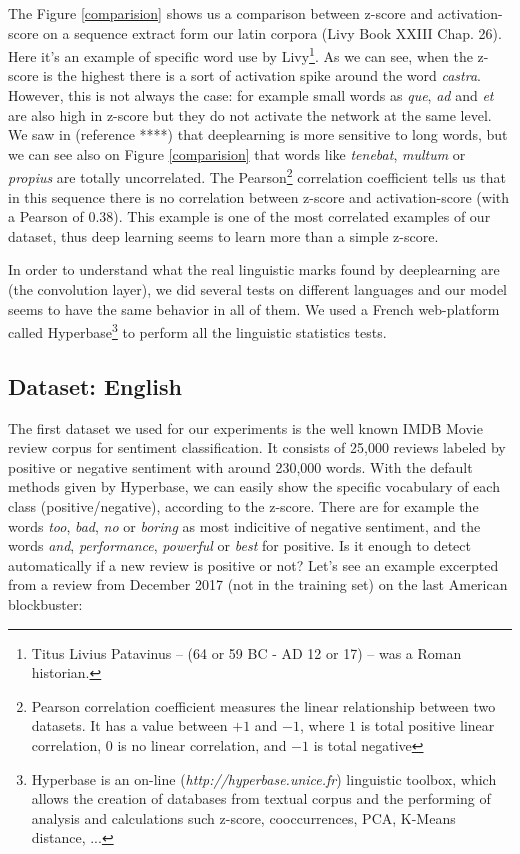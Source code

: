 The Figure \ref{comparision} shows us a comparison between z-score and activation-score on a sequence extract form our latin corpora (Livy Book XXIII Chap. 26). Here it's an example of specific word use by Livy\footnote{Titus Livius Patavinus -- (64 or 59 BC - AD 12 or 17) -- was a Roman historian.}. As we can see, when the z-score is the highest there is a sort of activation spike around the word \textit{castra}. However, this is not always the case: for example small words as \textit{que}, \textit{ad} and \textit{et} are also high in z-score but they do not activate the network at the same level. We saw in (reference ****) that deeplearning is more sensitive to long words, but we can see also on Figure \ref{comparision} that words like \textit{tenebat}, \textit{multum} or \textit{propius} are totally uncorrelated. The Pearson\footnote{Pearson correlation coefficient measures the linear relationship between two datasets. It has a value between $+1$ and $-1$, where $1$ is total positive linear correlation, $0$ is no linear correlation, and $-1$ is total negative} correlation coefficient tells us that in this sequence there is no correlation between z-score and activation-score (with a Pearson of 0.38). This example is one of the most correlated examples of our dataset, thus deep learning seems to learn more than a simple z-score.

In order to understand what the real linguistic marks found by deeplearning are (the convolution layer), we did several tests on different languages and our model seems to have the same behavior in all of them. We used a French web-platform called Hyperbase\footnote{Hyperbase is an on-line (\textit{http://hyperbase.unice.fr}) linguistic toolbox, which allows the creation of databases from textual corpus and the performing of analysis and calculations such z-score, cooccurrences, PCA, K-Means distance, ... } to perform all the linguistic statistics tests. 

\subsection{Dataset: English}

The first dataset we used for our experiments is the well known IMDB Movie review corpus for sentiment classification. It consists of 25,000 reviews labeled by positive or negative sentiment with around 230,000 words. With the default methods given by Hyperbase, we can easily show the specific vocabulary of each class (positive/negative), according to the z-score. There are for example the words \textit{too}, \textit{bad}, \textit{no} or \textit{boring} as most indicitive of negative sentiment, and the words \textit{and}, \textit{performance}, \textit{powerful} or \textit{best} for positive. 
Is it enough to detect automatically if a new review is positive or not? Let's see an example excerpted from a review from December 2017 (not in the training set) on the last American blockbuster:


